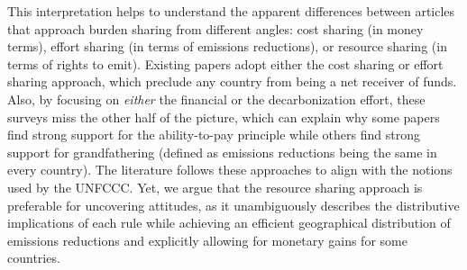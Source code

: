 \documentclass[12pt,english]{article}
\begin{document}
This interpretation helps to understand the apparent differences between articles that approach burden sharing from different angles: cost sharing (in money terms), effort sharing (in terms of emissions reductions), or resource sharing (in terms of rights to emit). Existing papers adopt either the cost sharing or effort sharing approach, which preclude any country from being a net receiver of funds. Also, by focusing on \textit{either} the financial or the decarbonization effort, these surveys miss the other half of the picture, which can explain why some papers find strong support for the ability-to-pay principle while others find strong support for grandfathering (defined as emissions reductions being the same in every country). The literature follows these approaches to align with the notions used by the UNFCCC. Yet, we argue that the resource sharing approach is preferable for uncovering attitudes, as it unambiguously describes the distributive implications of each rule while achieving an efficient geographical distribution of emissions reductions and explicitly allowing for monetary gains for some countries. %
\end{document}
